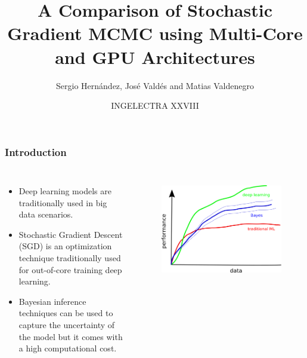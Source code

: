\documentclass[10pt,a4paper]{beamer}
\author{Sergio Hern\'andez, Jos\'e Vald\'es and Matias Valdenegro}
\institute
{
  \inst{1}%
    Laboratorio de Procesamiento de Informaci\'on Geoespacial.\\
	Universidad Cat\'olica del Maule. Chile\\ 
	\tt{shernandez@ucm.cl}
	\and
	\inst{2}%
	Centro de Innovaci\'on en Ingenier\'ia Aplicada.\\
	Universidad Cat\'olica del Maule. Chile.\\
	\and 
    \inst{3}%
	German Research Center for Artificial Intelligence\\
	Robotics Innovation Center. Germany.\\ 
}
\date{INGELECTRA XXVIII}
\title[A comparison of SG-MCMC using Multi-Core and GPU Architectures]{A Comparison of Stochastic Gradient MCMC using Multi-Core and GPU Architectures}
\begin{document}
\begin{frame}
\titlepage
\end{frame}

\begin{frame}\frametitle{Introduction}
\begin{columns}
	\begin{itemize}
		\item Deep learning models are traditionally used in big data scenarios.
		\item Stochastic Gradient Descent (SGD) is an optimization technique traditionally used for out-of-core training deep learning.
		\item Bayesian inference techniques can be used to capture the uncertainty of the model but it comes with a high computational cost. 
	\end{itemize}
	\begin{figure}
			\centering
			\includegraphics[width=1.2\linewidth]{figures/schematic_data}
			\label{fig:schematicdata}
	\end{figure}

	
\end{columns}
\end{frame}
\end{document}
